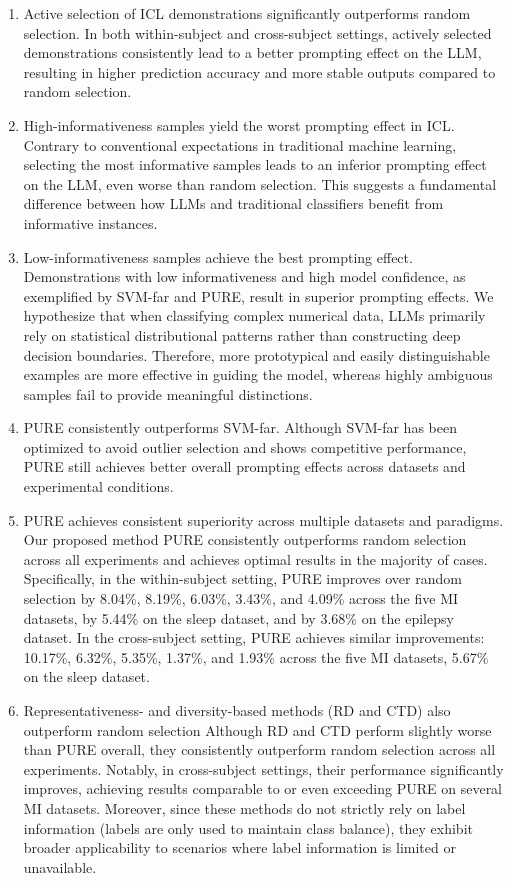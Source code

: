 \documentclass[journal,twocolumn]{IEEEtran}
\begin{document}
\begin{enumerate}
  \item {Active selection of ICL demonstrations significantly outperforms random selection.} In both within-subject and cross-subject settings, actively selected demonstrations consistently lead to a better prompting effect on the LLM, resulting in higher prediction accuracy and more stable outputs compared to random selection.
  
  \item {High-informativeness samples yield the worst prompting effect in ICL.} Contrary to conventional expectations in traditional machine learning, selecting the most informative samples leads to an inferior prompting effect on the LLM, even worse than random selection. This suggests a fundamental difference between how LLMs and traditional classifiers benefit from informative instances.
  
  \item {Low-informativeness samples achieve the best prompting effect.} Demonstrations with low informativeness and high model confidence, as exemplified by SVM-far and PURE, result in superior prompting effects. We hypothesize that when classifying complex numerical data, LLMs primarily rely on statistical distributional patterns rather than constructing deep decision boundaries. Therefore, more prototypical and easily distinguishable examples are more effective in guiding the model, whereas highly ambiguous samples fail to provide meaningful distinctions.
  
  \item {PURE consistently outperforms SVM-far.} Although SVM-far has been optimized to avoid outlier selection and shows competitive performance, PURE still achieves better overall prompting effects across datasets and experimental conditions.
  
  \item {PURE achieves consistent superiority across multiple datasets and paradigms.} Our proposed method PURE consistently outperforms random selection across all experiments and achieves optimal results in the majority of cases. Specifically, in the within-subject setting, PURE improves over random selection by 8.04\%, 8.19\%, 6.03\%, 3.43\%, and 4.09\% across the five MI datasets, by 5.44\% on the sleep dataset, and by 3.68\% on the epilepsy dataset. In the cross-subject setting, PURE achieves similar improvements: 10.17\%, 6.32\%, 5.35\%, 1.37\%, and 1.93\% across the five MI datasets, 5.67\% on the sleep dataset.
  
  \item {Representativeness- and diversity-based methods (RD and CTD) also outperform random selection} Although RD and CTD perform slightly worse than PURE overall, they consistently outperform random selection across all experiments. Notably, in cross-subject settings, their performance significantly improves, achieving results comparable to or even exceeding PURE on several MI datasets. Moreover, since these methods do not strictly rely on label information (labels are only used to maintain class balance), they exhibit broader applicability to scenarios where label information is limited or unavailable.
\end{enumerate}
\end{document}
